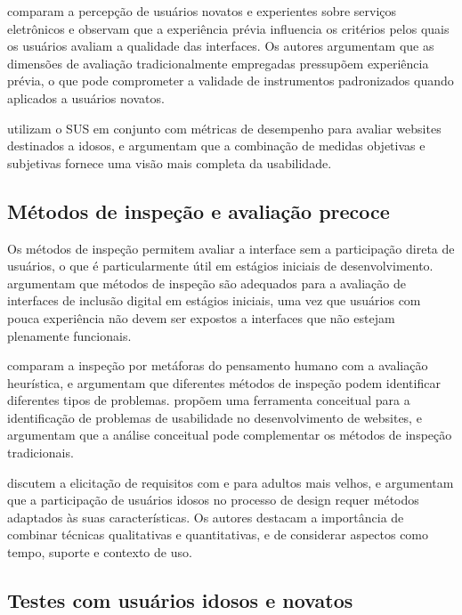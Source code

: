 \cite{nosseir2011novice} comparam a percepção de usuários novatos e experientes sobre serviços eletrônicos e observam que a experiência prévia influencia os critérios pelos quais os usuários avaliam a qualidade das interfaces. Os autores argumentam que as dimensões de avaliação tradicionalmente empregadas pressupõem experiência prévia, o que pode comprometer a validade de instrumentos padronizados quando aplicados a usuários novatos.

\cite{weighted_heuristic} utilizam o SUS em conjunto com métricas de desempenho para avaliar websites destinados a idosos, e argumentam que a combinação de medidas objetivas e subjetivas fornece uma visão mais completa da usabilidade.

\subsection{Métodos de inspeção e avaliação precoce}

\label{sec:inspecao}

Os métodos de inspeção permitem avaliar a interface sem a participação direta de usuários, o que é particularmente útil em estágios iniciais de desenvolvimento. \cite{filgueiras2009recoverability} argumentam que métodos de inspeção são adequados para a avaliação de interfaces de inclusão digital em estágios iniciais, uma vez que usuários com pouca experiência não devem ser expostos a interfaces que não estejam plenamente funcionais.

\cite{hornbaek2004usability} comparam a inspeção por metáforas do pensamento humano com a avaliação heurística, e argumentam que diferentes métodos de inspeção podem identificar diferentes tipos de problemas. \cite{skov2009conceptual} propõem uma ferramenta conceitual para a identificação de problemas de usabilidade no desenvolvimento de websites, e argumentam que a análise conceitual pode complementar os métodos de inspeção tradicionais.

\cite{sustar2008requirements} discutem a elicitação de requisitos com e para adultos mais velhos, e argumentam que a participação de usuários idosos no processo de design requer métodos adaptados às suas características. Os autores destacam a importância de combinar técnicas qualitativas e quantitativas, e de considerar aspectos como tempo, suporte e contexto de uso.

\subsection{Testes com usuários idosos e novatos}

